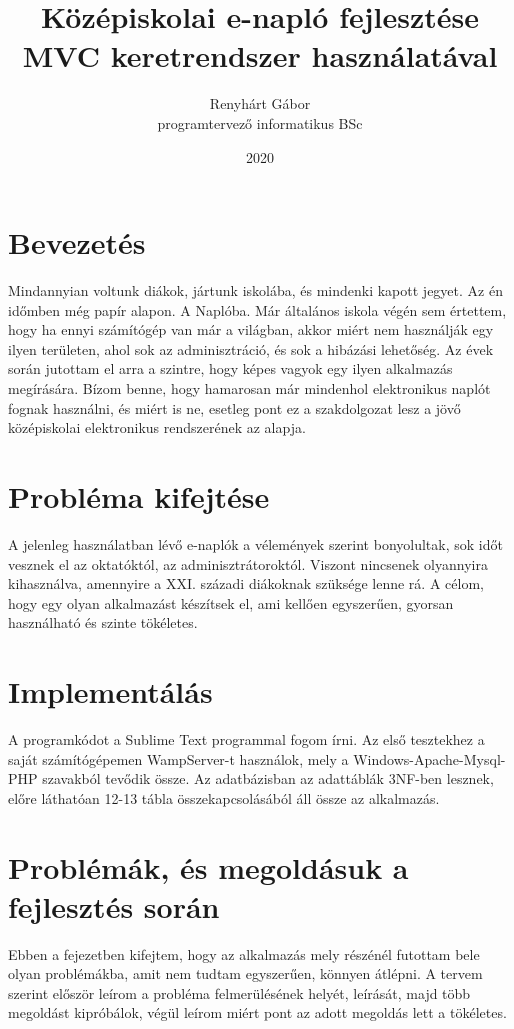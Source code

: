 \documentclass[
]{thesis-ekf}
\begin{document}
\title{Középiskolai e-napló fejlesztése MVC keretrendszer használatával}
\author{Renyhárt Gábor\\programtervező informatikus BSc}
\date{2020}
\maketitle

\tableofcontents

\chapter*{Bevezetés}
Mindannyian voltunk diákok, jártunk iskolába, és mindenki kapott jegyet. Az én időmben még papír alapon. A Naplóba. Már általános iskola végén sem értettem, hogy ha ennyi számítógép van már a világban, akkor miért nem használják egy ilyen területen, ahol sok az adminisztráció, és sok a hibázási lehetőség. Az évek során jutottam el arra a szintre, hogy képes vagyok egy ilyen alkalmazás megírására.
Bízom benne, hogy hamarosan már mindenhol elektronikus naplót fognak használni, és miért is ne, esetleg pont ez a szakdolgozat lesz a jövő középiskolai elektronikus rendszerének az alapja.


\chapter{Probléma kifejtése}
A jelenleg használatban lévő e-naplók a vélemények szerint bonyolultak, sok időt vesznek el az oktatóktól, az adminisztrátoroktól. Viszont nincsenek olyannyira kihasználva, amennyire a XXI. századi diákoknak szüksége lenne rá. A célom, hogy egy olyan alkalmazást készítsek el, ami kellően egyszerűen, gyorsan használható és szinte tökéletes.
\chapter{Implementálás}
A programkódot a Sublime Text programmal fogom írni. Az első tesztekhez a saját számítógépemen WampServer-t használok, mely a Windows-Apache-Mysql-PHP szavakból tevődik össze. Az adatbázisban az adattáblák 3NF-ben lesznek, előre láthatóan 12-13 tábla összekapcsolásából áll össze az alkalmazás.
\chapter{Problémák, és megoldásuk a fejlesztés során}
Ebben a fejezetben kifejtem, hogy az alkalmazás mely részénél futottam bele olyan problémákba, amit nem tudtam egyszerűen, könnyen átlépni. A tervem szerint először leírom a probléma felmerülésének helyét, leírását, majd több megoldást kipróbálok, végül leírom miért pont az adott megoldás lett a tökéletes.
\end{document}
